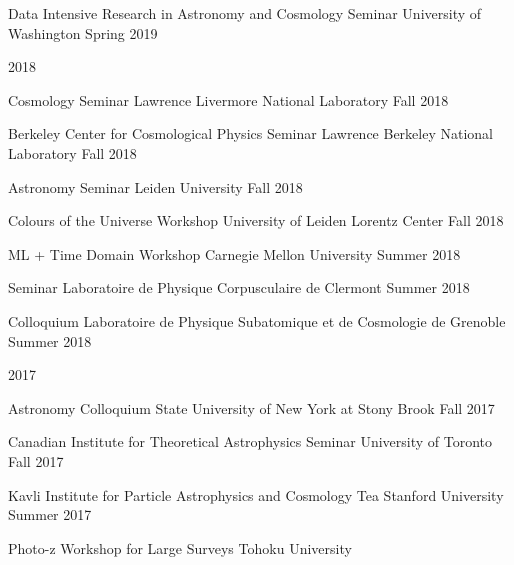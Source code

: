 \documentclass[11pt,letterpaper]{article}
\begin{document}
\begin{list}{}{\malzlist}
\begin{list}{}{\malzlist}
	{Data Intensive Research in Astronomy and Cosmology Seminar}
	{University of Washington}
	{Spring 2019}
\end{list}
\item 2018
\nopagebreak\begin{list}{}{\malzlist}
	\item {}
	{Cosmology Seminar}
	{Lawrence Livermore National Laboratory}
	{Fall 2018}
	\item {}
	{Berkeley Center for Cosmological Physics Seminar}
	{Lawrence Berkeley National Laboratory}
	{Fall 2018}
	\item {}
	{Astronomy Seminar}
	{Leiden University}
	{Fall 2018}
	\item {}
	{Colours of the Universe Workshop}
	{University of Leiden Lorentz Center}
	{Fall 2018}
	\item {}
	{ML + Time Domain Workshop}
	{Carnegie Mellon University}
	{Summer 2018}
	\item {}
	{Seminar}
	{Laboratoire de Physique Corpusculaire de Clermont}
	{Summer 2018}
	\item {}
	{Colloquium}
	{Laboratoire de Physique Subatomique et de Cosmologie de Grenoble}
	{Summer 2018}
\end{list}
\item 2017
\nopagebreak\begin{list}{}{\malzlist}
	\item {}
	{Astronomy Colloquium}
	{State University of New York at Stony Brook}
	{Fall 2017}
	\item {}
	{Canadian Institute for Theoretical Astrophysics Seminar}
	{University of Toronto}
	{Fall 2017}
	\item {}
	{Kavli Institute for Particle Astrophysics and Cosmology Tea}
	{Stanford University}
	{Summer 2017}
	\item {}
	{Photo-z Workshop for Large Surveys}
	{Tohoku University}

\end{list}
\end{list}
\end{document}
